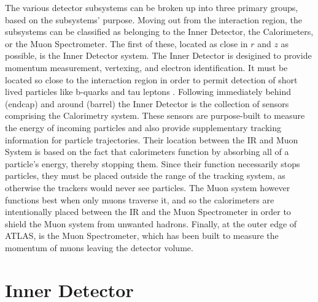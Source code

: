     The various detector subsystems can be broken up into three primary groups, based on the subsystems' purpose.
    Moving out from the interaction region, the subsystems can be classified as belonging to the Inner Detector, the Calorimeters, or the Muon Spectrometer.
    The first of these, located as close in $r$ and $z$ as possible, is the Inner Detector system.
    The Inner Detector is desigined to provide momentum measurement, vertexing, and electron identification.
    It must be located so close to the interaction region in order to permit detection of short lived particles like b-quarks and tau leptons \cite{id_tdr}.
    Following immediately behind (endcap) and around (barrel) the Inner Detector is the collection of sensors comprising the Calorimetry system.
    These sensors are purpose-built to measure the energy of incoming particles and also provide supplementary tracking information for particle trajectories.
    Their location between the IR and Muon System is based on the fact that calorimeters function by absorbing all of a particle's energy, thereby stopping them.
    Since their function necessarily stops particles, they must be placed outside the range of the tracking system, as otherwise the trackers would never see particles.
    The Muon system however functions best when only muons traverse it, and so the calorimeters are intentionally placed between the IR and the Muon Spectrometer in order to shield the Muon system from unwanted hadrons.
    Finally, at the outer edge of ATLAS, is the Muon Spectrometer, which has been built to measure the momentum of muons leaving the detector volume.
    




\section{Inner Detector} \label{sec:inner_detector}
    
